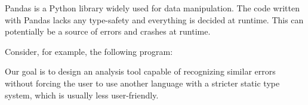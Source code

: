 \large
Pandas is a Python library widely used for data manipulation. %
The code written with Pandas lacks any type-safety and everything is decided at runtime.
This can potentially be a source of errors and crashes at runtime.

Consider, for example, the following program:


Our goal is to design an analysis tool capable of recognizing similar errors without forcing the user
to use another language with a stricter static type system, which is usually less user-friendly.
